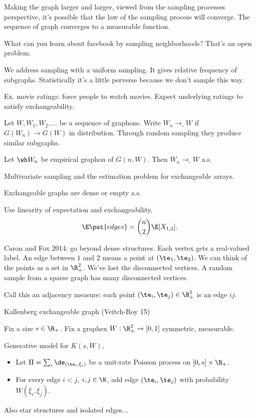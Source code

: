 Making the graph larger and larger, viewed from the sampling processes perspective, it's possible that the law of the sampling process will converge. The sequence of graph converges to a measurable function.


What can you learn about facebook by sampling neighborhoods? That's an open problem.

We address sampling with a uniform sampling. It gives relative frequency of subgraphs. Statistically it's a little perverse because we don't sample this way.

Ex. movie ratings: force people to watch movies. Expect underlying ratings to satisfy exchangeability.


Let $W,W_1,W_2,\ldots$ be a sequence of graphons. Write $W_n\to_{\square} W$ if $G(W_n)\to G(W)$ in distribution. Through random sampling they produce similar subgraphs.

\begin{thm}[Kallenberg 99]
Let $\wh W_n$ be empirical graphon of $G(n,W)$. Then $W_n\to_\square W$ a.s.
\end{thm}
Multivariate sampling and the estimation problem for exchangeable arrays.


\begin{cor}
Exchangeable graphs are dense or empty a.s.
\end{cor}
Use linearity of expectation and exchangeability, 
$$
\E\pat{edges} = \binom n2 \E[X_{1,2}].
$$

Caron and Fox 2014: go beyond dense structures. 
Each vertex gets a real-valued label. An edge between $1$ and $2$ means a point at $(\te_1,\te_2)$. We can think of the points as a set in $\R_+^2$. We've lost the disconnected vertices. A random sample from a sparse graph has many disconnected vertices.

Call this an adjacency measure: each point $(\te_i,\te_j)\in \R_+^2$ is an edge $ij$.

Kallenberg exchangeable graph (Veitch-Roy 15)

Fix a size $s\in \R_+$. Fix a graphex $W:\R_+^2\to [0,1]$ symmetric, measurable. 

Generative model for $K(s,W)$, 
\begin{itemize}
\item
Let $\Pi=\sum_i \de_{(\te_i,\xi_i)}$ be a unit-rate Poisson process on $[0,s]\times \R_+$. 
\item
For every edge $i<j$, $i,j\in \N$, add edge $(\te_i,\te_j)$ with probability $W(\xi_i,\xi_j)$. 
\end{itemize}
Also star structures and isolated edges...

